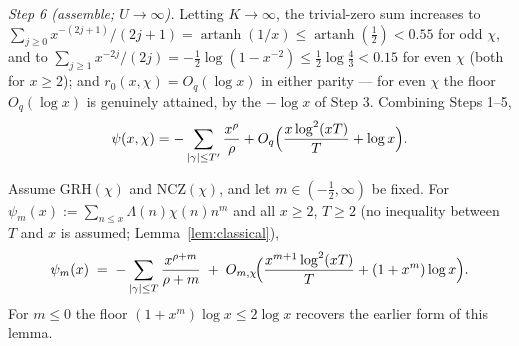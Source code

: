 \emph{Step 6 (assemble; $U\to\infty$).} Letting $K\to\infty$, the
trivial-zero sum increases to
$\sum_{j\ge0}x^{-(2j+1)}/(2j+1)=\operatorname{artanh}(1/x)
\le\operatorname{artanh}(\tfrac12)<0.55$ for odd $\chi$, and to
$\sum_{j\ge1}x^{-2j}/(2j)=-\tfrac12\log(1-x^{-2})
\le\tfrac12\log\tfrac43<0.15$ for even $\chi$ (both for $x\ge2$);
and $r_0(x,\chi)=O_q(\log x)$ in either parity --- for even $\chi$
the floor $O_q(\log x)$ is genuinely attained, by the $-\log x$ of
Step 3. Combining Steps 1--5,
\[
\psi(x,\chi)=-\sum_{|\gamma|\le T'}\frac{x^\rho}{\rho}
+O_q\Bigl(\frac{x\log^2(xT)}{T}+\log x\Bigr).
\]

\begin{lemma}\label{lem:trunc}
Assume GRH$(\chi)$ and NCZ$(\chi)$, and let $m\in(-\tfrac12,\infty)$
be fixed. For
$\psi_m(x):=\sum_{n\le x}\Lambda(n)\chi(n)n^m$ and all $x\ge2$,
$T\ge2$ (no inequality between $T$ and $x$ is assumed;
Lemma~\ref{lem:classical}),
\begin{equation}\label{eq:trunc}
\psi_m(x)\;=\;-\sum_{|\gamma|\le T}\frac{x^{\rho+m}}{\rho+m}
\;+\;O_{m,\chi}\!\Bigl(\frac{x^{m+1}\log^2(xT)}{T}+(1+x^m)\log x\Bigr).
\end{equation}
For $m\le0$ the floor $(1+x^m)\log x\le2\log x$ recovers the earlier
form of this lemma.
\end{lemma}


